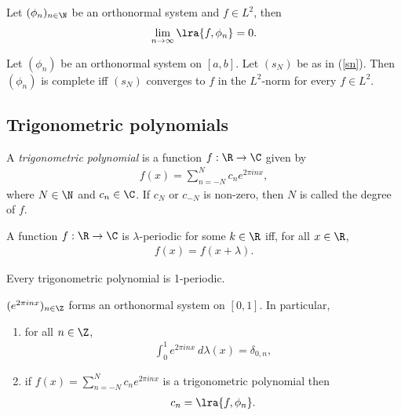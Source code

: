 \documentclass{article}
\begin{document}
\begin{corollary}
	Let $(\phi_n)_{n\in\N}$ be an orthonormal system and $f\in L^2$, then
	\begin{align*}
		\lim_{n\to\infty} \lra{f,\phi_n}=0.
	\end{align*}
\end{corollary}

\begin{theorem}[Notes 5.4]
	Let $(\phi_n)$ be an orthonormal system on $[a,b]$. Let $(s_N)$ be as in (\ref{sn}).
	Then $(\phi_n)$ is complete iff $(s_N)$ converges to $f$ in the $L^2$-norm
	for every $f\in L^2$.
\end{theorem}

\subsection{Trigonometric polynomials}

\begin{definition}
	A \emph{trigonometric polynomial} is a function $f:\R\to\C$ given by
	\begin{align*}
		f(x) = \sum_{n=-N}^N c_ne^{2\pi i n x},
	\end{align*}
	where $N\in\N$ and $c_n\in\C$. If $c_N$ or $c_{-N}$ is non-zero, then $N$ is called the
	degree of $f$.
\end{definition}

\begin{definition}
	A function $f:\R\to\C$ is $\lambda$-periodic for some $k\in\R$ iff,
	for all $x\in\R$,
	\begin{align*}
		f(x) = f(x + \lambda).
	\end{align*}
\end{definition}

\begin{lemma}
	Every trigonometric polynomial is 1-periodic.
\end{lemma}

\begin{lemma}[Notes 5.1]
	$(e^{2\pi inx})_{n\in\Z}$ forms an orthonormal system on $[0,1]$. In particular,
	\begin{enumerate}
		\item for all $n\in\Z$, \begin{align*}
			      \int_0^1 e^{2\pi inx}\:d\lambda(x) = \delta_{0,n},
		      \end{align*}
		\item if $f(x)=\sum_{n=-N}^N c_ne^{2\pi inx}$ is a trigonometric polynomial
			  then \begin{align*}
			      c_n = \lra{f,\phi_n}.
		      \end{align*}
	\end{enumerate}
\end{lemma}
\end{document}
